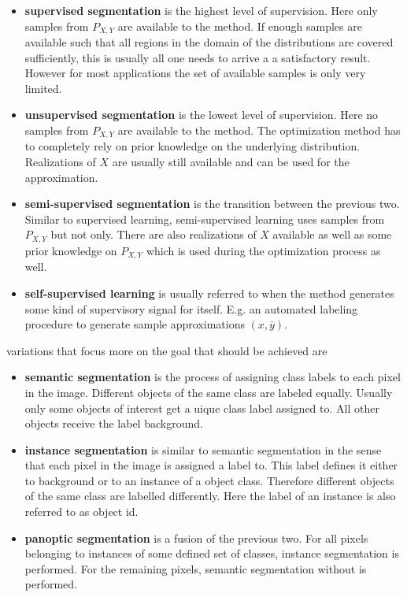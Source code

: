 \begin{itemize}
	\item \textbf{supervised segmentation} is the highest level of supervision. Here only samples from $P_{X, Y}$ are available to the method. If enough samples are available such that all regions in the domain of the distributions are covered sufficiently, this is usually all one needs to arrive a a satisfactory result. However for most applications the set of available samples is only very limited.
	\item \textbf{unsupervised segmentation} is the lowest level of supervision. Here no samples from $P_{X, Y}$ are available to the method. The optimization method has to completely rely on prior knowledge on the underlying distribution. Realizations of $X$ are usually still available and can be used for the approximation.
	\item \textbf{semi-supervised segmentation} is the transition between the previous two. Similar to supervised learning, semi-supervised learning uses samples from $P_{X, Y}$ but not only. There are also realizations of $X$ available as well as some prior knowledge on $P_{X, Y}$ which is used during the optimization process as well.
	\item \textbf{self-supervised learning} is usually referred to when the method generates some kind of supervisory signal for itself. E.g. an automated labeling procedure to generate sample approximations $(x, \bar{y})$.
\end{itemize}

variations that focus more on the goal that should be achieved are

\begin{itemize}
	\item \textbf{semantic segmentation} is the process of assigning class labels to each pixel in the image. Different objects of the same class are labeled equally. Usually only some objects of interest get a uique class label assigned to. All other objects receive the label background.
	\item \textbf{instance segmentation} is similar to semantic segmentation in the sense that each pixel in the image is assigned a label to. This label defines it either to background or to an instance of a object class. Therefore different objects of the same class are labelled differently. Here the label of an instance is also referred to as object id.
	\item \textbf{panoptic segmentation} is a fusion of the previous two. For all pixels belonging to instances of some defined set of classes, instance segmentation is performed. For the remaining pixels, semantic segmentation without is performed.
\end{itemize}